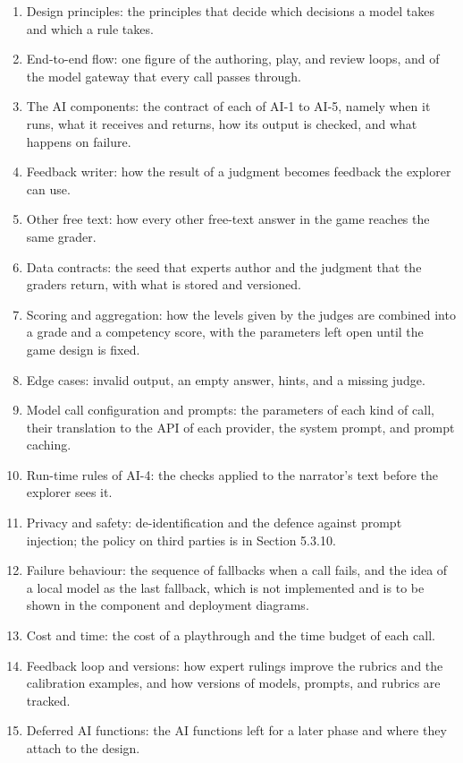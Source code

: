 \begin{enumerate}[leftmargin=1.5em]
  \item Design principles: the principles that decide which decisions a model takes and which a rule takes.
  \item End-to-end flow: one figure of the authoring, play, and review loops, and of the model gateway that every call passes through.
  \item The AI components: the contract of each of AI-1 to AI-5, namely when it runs, what it receives and returns, how its output is checked, and what happens on failure.
  \item Feedback writer: how the result of a judgment becomes feedback the explorer can use.
  \item Other free text: how every other free-text answer in the game reaches the same grader.
  \item Data contracts: the seed that experts author and the judgment that the graders return, with what is stored and versioned.
  \item Scoring and aggregation: how the levels given by the judges are combined into a grade and a competency score, with the parameters left open until the game design is fixed.
  \item Edge cases: invalid output, an empty answer, hints, and a missing judge.
  \item Model call configuration and prompts: the parameters of each kind of call, their translation to the API of each provider, the system prompt, and prompt caching.
  \item Run-time rules of AI-4: the checks applied to the narrator's text before the explorer sees it.
  \item Privacy and safety: de-\allowbreak{}identification and the defence against prompt injection; the policy on third parties is in Section 5.3.10.
  \item Failure behaviour: the sequence of fallbacks when a call fails, and the idea of a local model as the last fallback, which is not implemented and is to be shown in the component and deployment diagrams.
  \item Cost and time: the cost of a playthrough and the time budget of each call.
  \item Feedback loop and versions: how expert rulings improve the rubrics and the calibration examples, and how versions of models, prompts, and rubrics are tracked.
  \item Deferred AI functions: the AI functions left for a later phase and where they attach to the design.
\end{enumerate}

